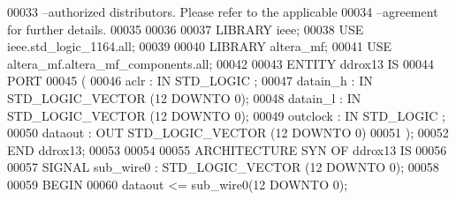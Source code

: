 \begin{DoxyCode}
{00033 \textcolor{keyword}{--authorized distributors.  Please refer to the applicable }
00034 \textcolor{keyword}{--agreement for further details.}
00035 
00036 
00037 \textcolor{vhdlkeyword}{LIBRARY }\textcolor{keywordflow}{ieee};
00038 \textcolor{vhdlkeyword}{USE }ieee.std\_logic\_1164.\textcolor{keywordflow}{all};
00039 
00040 \textcolor{vhdlkeyword}{LIBRARY }\textcolor{keywordflow}{altera\_mf};
00041 \textcolor{vhdlkeyword}{USE }altera_mf.altera\_mf\_components.\textcolor{keywordflow}{all};
00042 
00043 \textcolor{keywordflow}{ENTITY }ddrox13 \textcolor{keywordflow}{IS}
00044     \textcolor{keywordflow}{PORT}
00045     \textcolor{vhdlchar}{(}
00046         \textcolor{vhdlchar}{aclr}        \textcolor{vhdlchar}{:} \textcolor{keywordflow}{IN} \textcolor{comment}{STD\_LOGIC} ;
00047         \textcolor{vhdlchar}{datain_h}        \textcolor{vhdlchar}{:} \textcolor{keywordflow}{IN} \textcolor{comment}{STD\_LOGIC\_VECTOR} \textcolor{vhdlchar}{(}\textcolor{vhdllogic}{}\textcolor{vhdllogic}{12} \textcolor{keywordflow}{DOWNTO} \textcolor{vhdllogic}{}\textcolor{vhdllogic}{0}\textcolor{vhdlchar}{)};
00048         \textcolor{vhdlchar}{datain_l}        \textcolor{vhdlchar}{:} \textcolor{keywordflow}{IN} \textcolor{comment}{STD\_LOGIC\_VECTOR} \textcolor{vhdlchar}{(}\textcolor{vhdllogic}{}\textcolor{vhdllogic}{12} \textcolor{keywordflow}{DOWNTO} \textcolor{vhdllogic}{}\textcolor{vhdllogic}{0}\textcolor{vhdlchar}{)};
00049         \textcolor{vhdlchar}{outclock}        \textcolor{vhdlchar}{:} \textcolor{keywordflow}{IN} \textcolor{comment}{STD\_LOGIC} ;
00050         \textcolor{vhdlchar}{dataout}     \textcolor{vhdlchar}{:} \textcolor{keywordflow}{OUT} \textcolor{comment}{STD\_LOGIC\_VECTOR} \textcolor{vhdlchar}{(}\textcolor{vhdllogic}{}\textcolor{vhdllogic}{12} \textcolor{keywordflow}{DOWNTO} \textcolor{vhdllogic}{}\textcolor{vhdllogic}{0}\textcolor{vhdlchar}{)}
00051     \textcolor{vhdlchar}{)};
00052 \textcolor{keywordflow}{END} \textcolor{vhdlchar}{ddrox13};
00053 
00054 
00055 \textcolor{keywordflow}{ARCHITECTURE} SYN \textcolor{keywordflow}{OF} ddrox13 IS
00056 
00057     \textcolor{keywordflow}{SIGNAL} \textcolor{vhdlchar}{sub_wire0}    \textcolor{vhdlchar}{:} \textcolor{comment}{STD\_LOGIC\_VECTOR} \textcolor{vhdlchar}{(}\textcolor{vhdllogic}{}\textcolor{vhdllogic}{12} \textcolor{keywordflow}{DOWNTO} \textcolor{vhdllogic}{}\textcolor{vhdllogic}{0}\textcolor{vhdlchar}{)};
00058 
00059 \textcolor{vhdlkeyword}{BEGIN}
00060     \textcolor{vhdlchar}{dataout}    \textcolor{vhdlchar}{<=} \textcolor{vhdlchar}{sub_wire0}\textcolor{vhdlchar}{(}\textcolor{vhdllogic}{}\textcolor{vhdllogic}{12} \textcolor{keywordflow}{DOWNTO} \textcolor{vhdllogic}{}\textcolor{vhdllogic}{0}\textcolor{vhdlchar}{)};
}
\end{DoxyCode}
